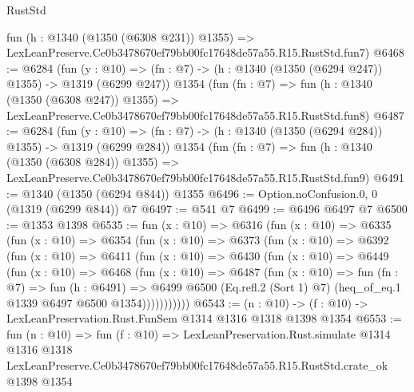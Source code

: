 \begin{lexlean}{RustStd}
\begin{coremodule}
    fun (h : @1340 (@1350 (@6308 @231)) @1355) =>
    LexLeanPreserve.Ce0b3478670ef79bb00fc17648de57a55.R15.RustStd.fun7)
@6468 := @6284
    (fun (y : @10) => (fn : @7) -> (h : @1340 (@1350 (@6294 @247)) @1355) -> @1319 (@6299 @247))
    @1354
    (fun (fn : @7) =>
    fun (h : @1340 (@1350 (@6308 @247)) @1355) =>
    LexLeanPreserve.Ce0b3478670ef79bb00fc17648de57a55.R15.RustStd.fun8)
@6487 := @6284
    (fun (y : @10) => (fn : @7) -> (h : @1340 (@1350 (@6294 @284)) @1355) -> @1319 (@6299 @284))
    @1354
    (fun (fn : @7) =>
    fun (h : @1340 (@1350 (@6308 @284)) @1355) =>
    LexLeanPreserve.Ce0b3478670ef79bb00fc17648de57a55.R15.RustStd.fun9)
@6491 := @1340 (@1350 (@6294 @844)) @1355
@6496 := Option.noConfusion.{0, 0} (@1319 (@6299 @844)) @7
@6497 := @541 @7
@6499 := @6496 @6497 @7
@6500 := @1353 @1398
@6535 := fun (x : @10) =>
  @6316
    (fun (x : @10) =>
    @6335
      (fun (x : @10) =>
      @6354
        (fun (x : @10) =>
        @6373
          (fun (x : @10) =>
          @6392
            (fun (x : @10) =>
            @6411
              (fun (x : @10) =>
              @6430
                (fun (x : @10) =>
                @6449
                  (fun (x : @10) =>
                  @6468
                    (fun (x : @10) =>
                    @6487
                      (fun (x : @10) =>
                      fun (fn : @7) =>
                      fun (h : @6491) =>
                      @6499
                        @6500
                        (Eq.refl.{2} (Sort 1) @7)
                        (heq_of_eq.{1} @1339 @6497 @6500 @1354)))))))))))
@6543 := (n : @10) -> (f : @10) -> LexLeanPreservation.Rust.FunSem @1314 @1316 @1318 @1398 @1354
@6553 := fun (n : @10) =>
  fun (f : @10) =>
  LexLeanPreservation.Rust.simulate
    @1314
    @1316
    @1318
    LexLeanPreserve.Ce0b3478670ef79bb00fc17648de57a55.R15.RustStd.crate_ok
    @1398
    @1354
\end{coremodule}
\end{lexlean}
